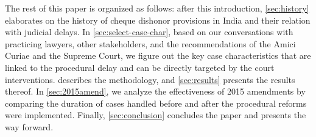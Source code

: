 \documentclass[12pt,a4paper]{article}
\begin{document}
%			
			
	The rest of this paper is organized as follows: after this introduction, \cref{sec:history} elaborates on the history of cheque dishonor provisions in India and their relation with judicial delays. In \cref{sec:select-case-char}, based on our conversations with practicing lawyers, other stakeholders, and the recommendations of the Amici Curiae and the Supreme Court, we figure out the key case characteristics that are linked to the procedural delay and can be directly targeted by the court interventions.  describes the methodology, and \cref{sec:results} presents the results thereof. In \cref{sec:2015amend}, we analyze the effectiveness of 2015 amendments by comparing the duration of cases handled before and after the procedural reforms were implemented. Finally, \cref{sec:conclusion} concludes the paper and presents the way forward.
	
\end{document}

